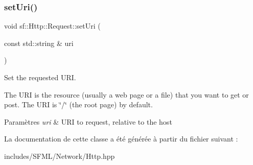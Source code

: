 \subsubsection{\texorpdfstring{set\+Uri()}{setUri()}}
{\footnotesize\ttfamily void sf\+::\+Http\+::\+Request\+::set\+Uri (\begin{DoxyParamCaption}\item[{const std\+::string \&}]{uri }\end{DoxyParamCaption})}



Set the requested U\+RI. 

The U\+RI is the resource (usually a web page or a file) that you want to get or post. The U\+RI is \char`\"{}/\char`\"{} (the root page) by default.


\begin{DoxyParams}{Paramètres}
{\em uri} & U\+RI to request, relative to the host \\
\hline
\end{DoxyParams}


La documentation de cette classe a été générée à partir du fichier suivant \+:\begin{DoxyCompactItemize}
\item 
includes/\+S\+F\+M\+L/\+Network/Http.\+hpp\end{DoxyCompactItemize}
